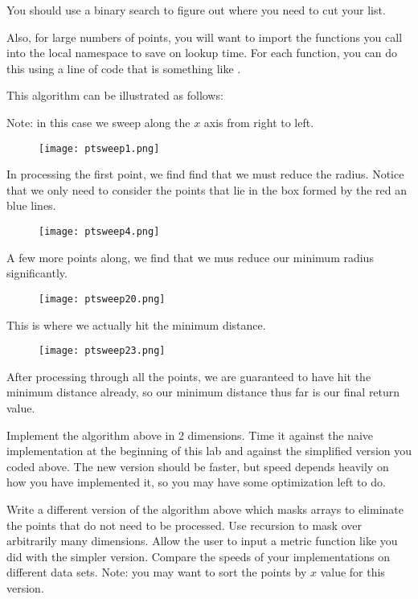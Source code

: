 You should use a binary search to figure out where you need to cut your list. 

Also, for large numbers of points, you will want to import the functions you call into the local namespace to save on lookup time. 
For each function, you can do this using a line of code that is something like . 

This algorithm can be illustrated as follows:

Note: in this case we sweep along the $x$ axis from right to left.

\begin{figure}
\texttt{[image: ptsweep1.png]}
\end{figure}
In processing the first point, we find find that we must reduce the radius. Notice that we only need to consider the points that lie in the box formed by the red an blue lines.

\begin{figure}
\texttt{[image: ptsweep4.png]}
\end{figure}
A few more points along, we find that we mus reduce our minimum radius significantly.

\begin{figure}
\texttt{[image: ptsweep20.png]}
\end{figure}
This is where we actually hit the minimum distance.

\begin{figure}
\texttt{[image: ptsweep23.png]}
\end{figure}
After processing through all the points, we are guaranteed to have hit the minimum distance already, so our minimum distance thus far is our final return value.

\begin{problem}
Implement the algorithm above in 2 dimensions. 
Time it against the naive implementation at the beginning of this lab and against the simplified version you coded above.
The new version should be faster, but speed depends heavily on how you have implemented it, so you may have some optimization left to do.
\end{problem}

\begin{problem}
Write a different version of the algorithm above which masks arrays to eliminate the points that do not need to be processed. 
Use recursion to mask over arbitrarily many dimensions. 
Allow the user to input a metric function like you did with the simpler version.
Compare the speeds of your implementations on different data sets.
Note: you may want to sort the points by $x$ value for this version.
\end{problem}

